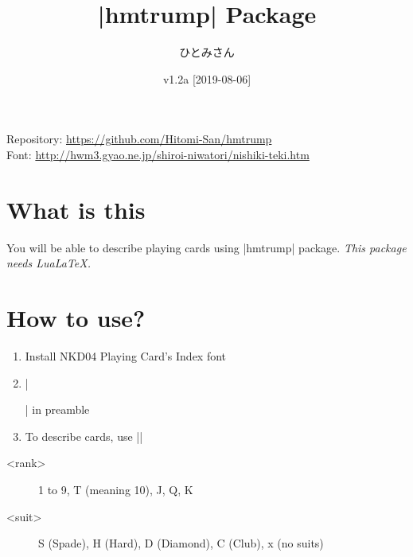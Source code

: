 \documentclass{jlreq}
\title{|hmtrump| Package}
\author{ひとみさん}
\date{v1.2a [2019-08-06]}
\begin{document}
\maketitle

\begin{center}
Repository: \url{https://github.com/Hitomi-San/hmtrump}\\
Font: \url{http://hwm3.gyao.ne.jp/shiroi-niwatori/nishiki-teki.htm}
\end{center}

\hrulefill
\tableofcontents
\pagebreak

\section{What is this}
You will be able to describe playing cards using |hmtrump| package.
\emph{This package needs LuaLaTeX.}


\section{How to use?}
\begin{enumerate}
\item Install NKD04 Playing Card's Index font
\item |\usepackage{hmtrump}| in preamble
\item To describe cards, use ||
\end{enumerate}

\begin{description}
\item[<rank>] 1 to 9, T (meaning 10), J, Q, K
\item[<suit>] S (Spade), H (Hard), D (Diamond), C (Club), x (no suits)
\end{description}
\end{document}

